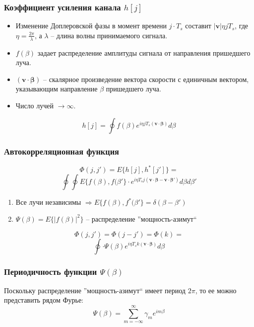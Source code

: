 \documentclass[utf8]{beamer}
\begin{document}
\begin{frame}
\frametitle{Коэффициент усиления канала $h[j]$}
\begin{itemize}
        \item Изменение Доплеровской фазы в момент времени $j\cdot T_s$ составит $|\boldsymbol{v}|\eta j T_s$, где $\eta = \frac{2\pi }{\lambda}$, а $\lambda$ -- длина волны принимаемого сигнала.
        \item $f(\beta)$ задает распределение амплитуды сигнала от направления пришедшего луча.
        \item $(\boldsymbol{v}\cdot \boldsymbol{\beta})$ -- скалярное произведение вектора скорости с единичным вектором, указывающим направление $\beta$ пришедшего луча.
        \item Число лучей $\rightarrow \infty$.
\end{itemize}
\begin{center}
\Large{
$$h[j] = \oint f(\beta)e^{i\eta j T_s (\boldsymbol{v}\cdot \boldsymbol{\beta})}d\beta$$
}
\end{center}
\end{frame}
\begin{frame}
\frametitle{Автокорреляционная функция}
\begin{center}
\Large{
$$\Phi(j, j') = E\{h[j], h^{\ast}[j']\} = $$
$$\oint\oint E\{f(\beta), f(\beta'\}\cdot
e^{i \eta T_s j (\boldsymbol{v} \cdot \boldsymbol{\beta} - \boldsymbol{v} \cdot \boldsymbol{\beta'})}d\beta d\beta'$$
}
\end{center}
\begin{enumerate}
        \item Все лучи независимы $\Rightarrow E\{f(\beta), f^{\ast}(\beta'\} = \delta (\beta - \beta')$
        \item $\Psi(\beta) = E\{|f(\beta)|^2\}$ -- распределение ''мощность-азимут``
\end{enumerate}
\begin{center}
\Large{
$$\Phi(j, j') = \Phi(j - j') = \Phi(k) =$$
$$\oint \cdot \Psi(\beta) e^{i \eta T_s k (\boldsymbol{v} \cdot \boldsymbol{\beta})}d\beta$$
}
\end{center}
\end{frame}
\begin{frame}
\frametitle{Периодичность функции $\Psi(\beta)$}
Поскольку распределение ''мощность-азимут`` имеет период $2\pi$, то ее можно представить рядом Фурье:
$$\Psi(\beta) = \sum_{m=-\infty}^{\infty} \gamma_m e^{i m \beta}$$
\end{frame}
\end{document}
